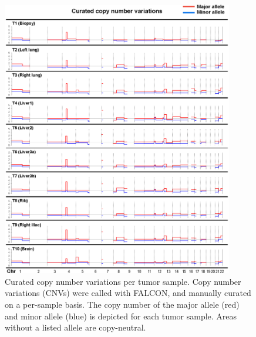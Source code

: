 \begin{figure}[htp]
    \begin{center}
        \includegraphics[width=0.9\textwidth,keepaspectratio]{images/303/cnv_plots}
    \end{center}
    \caption[Curated copy number variations per tumor sample.]{Curated copy number variations per tumor sample. Copy number variations (CNVs) were called with FALCON, and manually curated on a per-sample basis. The copy number of the major allele (red) and minor allele (blue) is depicted for each tumor sample. Areas without a listed allele are copy-neutral.}
    \label{fig:303:cnv_plots}
\end{figure}
